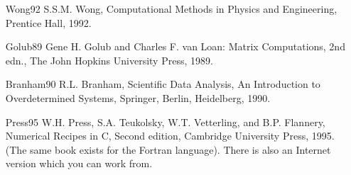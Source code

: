 \documentclass{article}
\begin{document}
\begin{itemize} 
\item[Wong92] S.S.M. Wong, Computational Methods in Physics and Engineering, Prentice Hall, 1992.
\item[Golub89] Gene H. Golub and Charles F. van Loan: Matrix Computations, 2nd edn., The John Hopkins University Press, 1989.
\item[Branham90] R.L. Branham, Scientific Data Analysis, An Introduction to Overdetermined Systems, Springer, Berlin, Heidelberg, 1990.
\item[Press95] W.H. Press, S.A. Teukolsky, W.T. Vetterling, and B.P. Flannery, Numerical Recipes in C, Second edition, Cambridge University Press, 1995. (The same book exists for the Fortran language). There is also an Internet version which you can work from.
\end{itemize}
\end{document}
